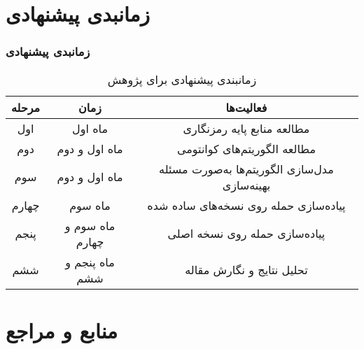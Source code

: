 \documentclass[xcolor=dvipsnames, professionalfonts, aspectratio=169, 11pt]{beamer}
\begin{document}
\section{زمانبدی پیشنهادی}
\begin{frame}
    \frametitle{زمانبدی پیشنهادی}
    \begin{table}
        \caption{زمانبندی پیشنهادى براى پژوهش}
        \vspace{-1em}
        \small
        \begin{tabular}{|c|c|c|}
            \hline
            \textbf{مرحله} & \textbf{زمان} & \textbf{فعالیت‌ها} \\
            \hline
            اول & ماه اول & مطالعه منابع پایه رمزنگارى \\
            \hline
            دوم & ماه اول و دوم & مطالعه الگوریتم‌هاى کوانتومى \\
            \hline
            سوم & ماه اول و دوم & مدل‌سازى الگوریتم‌ها به‌صورت مسئله بهینه‌سازى \\
            \hline
            چهارم & ماه سوم & پیاده‌سازى حمله روى نسخه‌هاى ساده شده \\
            \hline
            پنجم & ماه سوم و چهارم & پیاده‌سازى حمله روى نسخه اصلى \\
            \hline
            ششم & ماه پنجم و ششم & تحلیل نتایج و نگارش مقاله \\
            \hline
        \end{tabular}
    \end{table}
\end{frame}

\section{منابع و مراجع}
\begin{frame}
    \begin{latin}
        \scriptsize
        
    \end{latin}

\end{frame}
\end{document}
